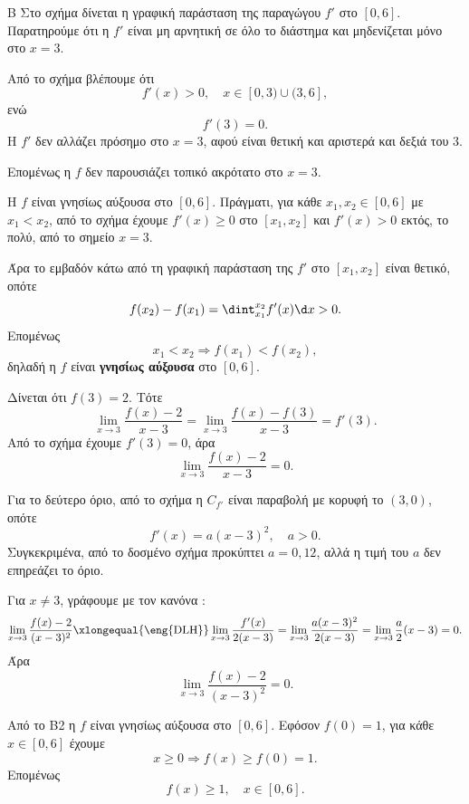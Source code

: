 
\begin{thema}{Β}
Στο σχήμα δίνεται η γραφική παράσταση της παραγώγου $f'$ στο $[0,6]$. Παρατηρούμε ότι η $f'$ είναι μη αρνητική σε όλο το διάστημα και μηδενίζεται μόνο στο $x=3$.

\begin{erwthma}
\item Από το σχήμα βλέπουμε ότι
\[
f'(x)>0,\quad x\in[0,3)\cup(3,6],
\]
ενώ
\[
f'(3)=0.
\]
Η $f'$ δεν αλλάζει πρόσημο στο $x=3$, αφού είναι θετική και αριστερά και δεξιά του $3$.

Επομένως η $f$ δεν παρουσιάζει τοπικό ακρότατο στο $x=3$.

\item Η $f$ είναι γνησίως αύξουσα στο $[0,6]$. Πράγματι, για κάθε $x_1,x_2\in[0,6]$ με $x_1<x_2$, από το σχήμα έχουμε $f'(x)\geq 0$ στο $[x_1,x_2]$ και $f'(x)>0$ εκτός, το πολύ, από το σημείο $x=3$.

Άρα το εμβαδόν κάτω από τη γραφική παράσταση της $f'$ στο $[x_1,x_2]$ είναι θετικό, οπότε
\[
f(x_2)-f(x_1)=\dint_{x_1}^{x_2}f'(x)\d x>0.
\]
Επομένως
\[
x_1<x_2\Rightarrow f(x_1)<f(x_2),
\]
δηλαδή η $f$ είναι \textbf{γνησίως αύξουσα} στο $[0,6]$.

\item Δίνεται ότι $f(3)=2$. Τότε
\[
\lim_{x\to 3}\frac{f(x)-2}{x-3}
=\lim_{x\to 3}\frac{f(x)-f(3)}{x-3}
=f'(3).
\]
Από το σχήμα έχουμε $f'(3)=0$, άρα
\[
\lim_{x\to 3}\frac{f(x)-2}{x-3}=0.
\]

Για το δεύτερο όριο, από το σχήμα η $C_{f'}$ είναι παραβολή με κορυφή το $(3,0)$, οπότε
\[
f'(x)=a(x-3)^2,\quad a>0.
\]
Συγκεκριμένα, από το δοσμένο σχήμα προκύπτει $a=0{,}12$, αλλά η τιμή του $a$ δεν επηρεάζει το όριο.

Για $x\neq 3$, γράφουμε με τον κανόνα :
\[
\lim_{x\to 3}\frac{f(x)-2}{(x-3)^2}
\xlongequal{\text{\eng{DLH}}}
\lim_{x\to 3}\frac{f'(x)}{2(x-3)}
=\lim_{x\to 3}\frac{a(x-3)^2}{2(x-3)}
=\lim_{x\to 3}\frac{a}{2}(x-3)=0.
\]
Άρα
\[
\lim_{x\to 3}\frac{f(x)-2}{(x-3)^2}=0.
\]

\item Από το Β2 η $f$ είναι γνησίως αύξουσα στο $[0,6]$. Εφόσον $f(0)=1$, για κάθε $x\in[0,6]$ έχουμε
\[
x\geq 0 \Rightarrow f(x)\geq f(0)=1.
\]
Επομένως
\[
f(x)\geq 1,\quad x\in[0,6].
\]
\end{erwthma}
\end{thema}

